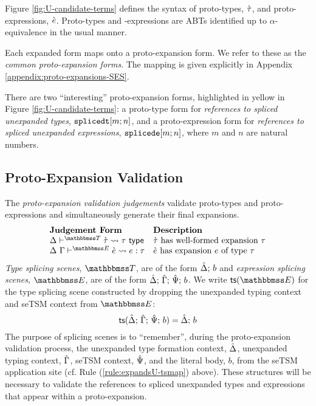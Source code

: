 Figure \ref{fig:U-candidate-terms} defines the syntax of proto-types, $\grave{\tau}$, and proto-expressions, $\grave{e}$. Proto-types and -expressions are ABTs identified up to $\alpha$-equivalence in the usual manner.

Each expanded form maps onto a proto-expansion form. We refer to these as the \emph{common proto-expansion forms}. The mapping is given explicitly in Appendix \ref{appendix:proto-expansions-SES}.

There are two ``interesting'' proto-expansion forms, highlighted in yellow in Figure \ref{fig:U-candidate-terms}: a proto-type form for \emph{references to spliced unexpanded types}, $\texttt{splicedt}[m; n]$, and a proto-expression form for \emph{references to spliced unexpanded expressions}, $\texttt{splicede}[m; n]$, where $m$ and $n$ are natural numbers.%

\subsection{Proto-Expansion Validation}\label{sec:ce-validation-U}



The \emph{proto-expansion validation judgements} validate proto-types and proto-expressions and simultaneously generate their final expansions.%
\[\begin{array}{ll}
\textbf{Judgement Form} & \textbf{Description}\\
\cvalidT{\Delta}{\tscenev}{\ctau}{\tau} & \text{$\ctau$ has well-formed expansion $\tau$}\\
\cvalidE{\Delta}{\Gamma}{\escenev}{\ce}{e}{\tau} & \text{$\ce$ has expansion $e$ of type $\tau$}
\end{array}\]
\emph{Type splicing scenes}, $\tscenev$, are of the form $\hat{\Delta};\,b$ and \emph{expression splicing scenes}, $\escenev$, are of the form $\hat{\Delta};\,\hat{\Gamma};\,\hat{\Psi};\,b$. We write $\tsfrom{\escenev}$ for the type splicing scene constructed by dropping the unexpanded typing context and seTSM context from $\escenev$:
\[\mathsf{ts}(\hat{\Delta};\,\hat{\Gamma};\,\hat{\Psi};\,b) = \hat{\Delta};\,b\]
The purpose of splicing scenes is to ``remember'', during the proto-expansion validation process, the unexpanded type formation context, $\hat{\Delta}$, unexpanded typing context, $\hat{\Gamma}$, seTSM context, $\hat{\Psi}$, and the literal body, $b$, from the seTSM application site (cf. Rule (\ref{rule:expandsU-tsmap}) above). These structures will be necessary to validate the references to spliced unexpanded types and expressions that appear within a proto-expansion.

